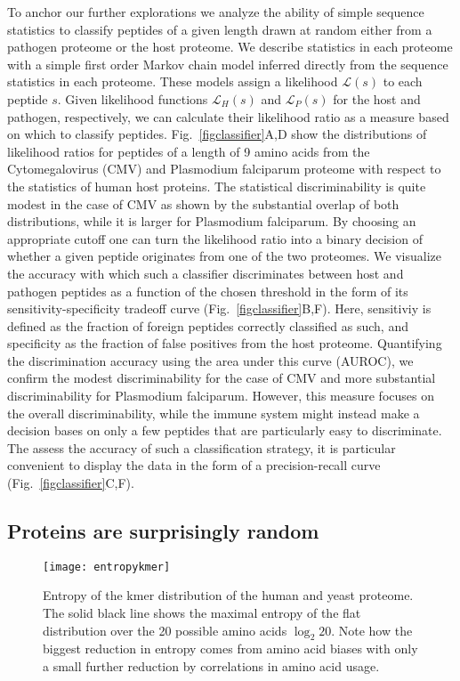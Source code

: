 \documentclass[superscriptaddress,twocolumn,pre]{revtex4}
\newcommand{\<}{\langle}
\renewcommand{\>}{\rangle}
\begin{document}
To anchor our further explorations we analyze the ability of simple sequence statistics to classify peptides of a given length drawn at random either from a pathogen proteome or the host proteome. We describe statistics in each proteome with a simple first order Markov chain model inferred directly from the sequence statistics in each proteome. These models assign a likelihood $\mathcal{L}(s)$ to each peptide $s$. Given likelihood functions $\mathcal{L}_H(s)$ and $\mathcal{L}_P(s)$ for the host and pathogen, respectively, we can calculate their likelihood ratio as a measure based on which to classify peptides. Fig.~\ref{figclassifier}A,D show the distributions of likelihood ratios for peptides of a length of 9 amino acids from the Cytomegalovirus (CMV) and Plasmodium falciparum proteome with respect to the statistics of human host proteins. The statistical discriminability is quite modest in the case of CMV as shown by the substantial overlap of both distributions, while it is larger for Plasmodium falciparum. By choosing an appropriate cutoff one can turn the likelihood ratio into a binary decision of whether a given peptide originates from one of the two proteomes. We visualize the accuracy with which such a classifier discriminates between host and pathogen peptides as a function of the chosen threshold in the form of its sensitivity-specificity tradeoff curve (Fig.~\ref{figclassifier}B,F). Here, sensitiviy is defined as the fraction of foreign peptides correctly classified as such, and specificity as the fraction of false positives from the host proteome. Quantifying the discrimination accuracy using the area under this curve (AUROC), we confirm the modest discriminability for the case of CMV and more substantial discriminability for Plasmodium falciparum. However, this measure focuses on the overall discriminability, while the immune system might instead make a decision bases on only a few peptides that are particularly easy to discriminate. The assess the accuracy of such a classification strategy, it is particular convenient to display the data in the form of a precision-recall curve (Fig.~\ref{figclassifier}C,F).




\subsection{Proteins are surprisingly random}

\begin{figure}
    \texttt{[image: entropykmer]}
    \caption{Entropy of the kmer distribution of the human and yeast proteome. The solid black line shows the maximal entropy of the flat distribution over the 20 possible amino acids $\log_2 20$. Note how the biggest reduction in entropy comes from amino acid biases with only a small further reduction by correlations in amino acid usage.
    \label{figentropykmer}
    }
\end{figure}
\end{document}
